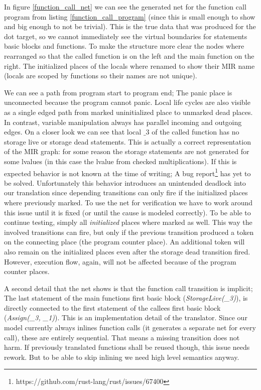In figure \ref{function_call_net} we can see the generated net for the function call program from listing \ref{function_call_program} (since this is small enough to show and big enough to not be trivial).
This is the true data that was produced for the dot target, so we cannot immediately see the virtual boundaries for statements basic blocks and functions.
To make the structure more clear the nodes where rearranged so that the called function is on the left and the main function on the right.
The initialized places of the locals where renamed to show their MIR name (locals are scoped by functions so their names are not unique).

We can see a path from program start to program end;
The panic place is unconnected because the program cannot panic.
Local life cycles are also visible as a single edged path from marked uninitialized place to unmarked dead places.
In contrast, variable manipulation always has parallel incoming and outgoing edges.
On a closer look we can see that local $\_3$ of the called function has no storage live or storage dead statements.
This is actually a correct representation of the MIR graph:
for some reason the storage statements are not generated for some lvalues (in this case the lvalue from checked multiplications).
If this is expected behavior is not known at the time of writing;
A bug report\footnote{https://github.com/rust-lang/rust/issues/67400} has yet to be solved.
Unfortunately this behavior introduces an unintended deadlock into our translation since depending transitions can only fire if the initialized places where previously marked.
To use the net for verification we have to work around this issue until it is fixed (or until the cause is modeled correctly).
To be able to continue testing, simply all \textit{initialized} places where marked as well.
This way the involved transitions can fire, but only if the previous transition produced a token on the connecting place (the program counter place).
An additional token will also remain on the initialized places even after the storage dead transition fired.
However, execution flow, again, will not be affected because of the program counter places.

A second detail that the net shows is that the function call transition is implicit;
The last statement of the main functions first basic block (\textit{StorageLive(\_3)}), is directly connected to the first statement of the callees first basic block (\textit{Assign(\_3, \_1)}).
This is an implementation detail of the translator.
Since our model currently always inlines function calls (it generates a separate net for every call), these are entirely sequential.
That means a missing transition does not harm.
If previously translated functions shall be reused though, this issue needs rework.
But to be able to skip inlining we need high level semantics anyway.


